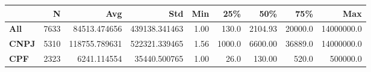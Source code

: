 \begin{tabular}{lrrrrrrrr}
\toprule
{} &    N &            Avg &            Std &   Min &     25\% &      50\% &      75\% &         Max \\
\midrule
\textbf{All } & 7633 &   84513.474656 &  439138.341463 &  1.00 &   130.0 &  2104.93 &  20000.0 &  14000000.0 \\
\textbf{CNPJ} & 5310 &  118755.789631 &  522321.339465 &  1.56 &  1000.0 &  6600.00 &  36889.0 &  14000000.0 \\
\textbf{CPF } & 2323 &    6241.114554 &   35440.500765 &  1.00 &    26.0 &   130.00 &    520.0 &    500000.0 \\
\bottomrule
\end{tabular}
